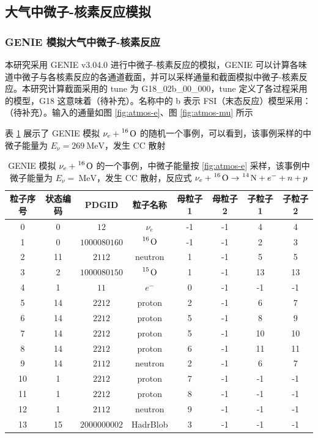 \documentclass[12pt]{article}
\begin{document}
\subsection{大气中微子-核素反应模拟}

\subsubsection{GENIE 模拟大气中微子-核素反应}

本研究采用 GENIE v3.04.0 进行中微子-核素反应的模拟，GENIE 可以计算各味道中微子与各核素反应的各通道截面，并可以采样通量和截面模拟中微子-核素反应。本研究计算截面采用的 tune 为 G18\_02b\_00\_000，tune 定义了各过程采用的模型，G18 这意味着（待补充）。名称中的 b 表示 FSI（末态反应）模型采用：（待补充）。输入的通量如图 \ref{fig:atmos-e}、图 \ref{fig:atmos-mu} 所示

表 \ref{tab:genie-evt} 展示了 GENIE 模拟 $\nu_e + \ce{{}^{16} O}$ 的随机一个事例，可以看到，该事例采样的中微子能量为 $E_{\nu} = \SI{269}{\MeV}$，发生 CC 散射

\begin{table}[!htb]
    \centering
    \caption{GENIE 模拟 $\nu_e + \ce{{}^{16} O}$ 的一个事例，中微子能量按 \ref{fig:atmos-e} 采样，该事例中微子能量为 $E_{\nu} = \SI{}{\MeV}$，发生 CC 散射，反应式 $\nu_e + \ce{{}^{16} O} \to \ce{{}^{14} N} + e^- + n + p$}
    \begin{tabular}{c|c|cc|cc|cc}
        粒子序号 & 状态编码 & PDGID & 粒子名称 & 母粒子 1 & 母粒子 2 & 子粒子 1 & 子粒子 2 \\
        \hline
        0 & 0 & $12$ & $\nu_e$ & -1 & -1 & 4 & 4 \\
        1 & 0 & $1000080160$ & $\ce{{}^{16} O}$ & -1 & -1 & 2 & 3 \\
        2 & 11 & $2112$ & neutron & 1 & -1 & 5 & 5 \\
        3 & 2 & $1000080150$ & $\ce{{}^{15} O}$ & 1 & -1 & 13 & 13 \\
        4 & 1 & $11$ & $e^-$ & 0 & -1 & -1 & -1 \\
        5 & 14 & $2212$ & proton & 2 & -1 & 6 & 7 \\
        6 & 14 & $2212$ & proton & 5 & -1 & 8 & 9 \\
        7 & 14 & $2212$ & proton & 5 & -1 & 10 & 10 \\
        8 & 14 & $2212$ & proton & 6 & -1 & 11 & 11 \\
        9 & 14 & $2112$ & neutron & 2 & -1 & 6 & 7 \\
        10 & 1 & $2212$ & proton & 7 & -1 & -1 & -1 \\
        11 & 1 & $2212$ & proton & 8 & -1 & -1 & -1 \\
        12 & 1 & $2112$ & neutron & 9 & -1 & -1 & -1 \\
        13 & 15 & $2000000002$ & HadrBlob & 3 & -1 & -1 & -1 \\
    \end{tabular}
    \label{tab:genie-evt}
\end{table}
\end{document}
